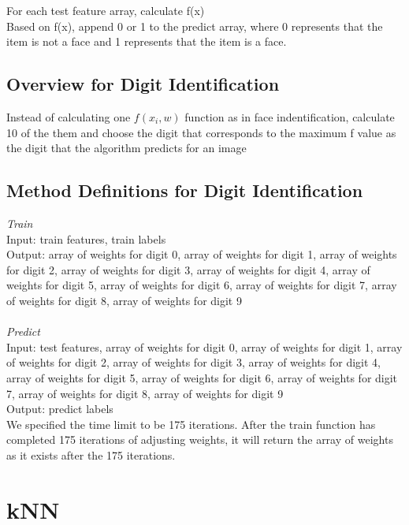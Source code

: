 \documentclass{article}
\begin{document}
For each test feature array, calculate f(x)\\
Based on f(x), append 0 or 1 to the predict array, where 0 represents that the item is not a face and 1 represents that the item is a face.

\subsection{Overview for Digit Identification}

Instead of calculating one $f(x_i,w)$ function as in face indentification, calculate 10 of the them and choose the digit that corresponds to the maximum f value as the digit that the algorithm predicts for an image

\subsection{Method Definitions for Digit Identification}
\textit{Train}\\
Input: train features, train labels\\
Output: array of weights for digit 0, array of weights for digit 1, array of weights for digit 2, array of weights for digit 3, array of weights for digit 4, array of weights for digit 5, array of weights for digit 6, array of weights for digit 7, array of weights for digit 8, array of weights for digit 9\\\\
\textit{Predict}\\
Input: test features, array of weights for digit 0, array of weights for digit 1, array of weights for digit 2, array of weights for digit 3, array of weights for digit 4, array of weights for digit 5, array of weights for digit 6, array of weights for digit 7, array of weights for digit 8, array of weights for digit 9\\
Output: predict labels\\

We specified the time limit to be 175 iterations. After the train function has completed 175 iterations of adjusting weights, it will return the array of weights as it exists after the 175 iterations.


\section{kNN}
\end{document}
